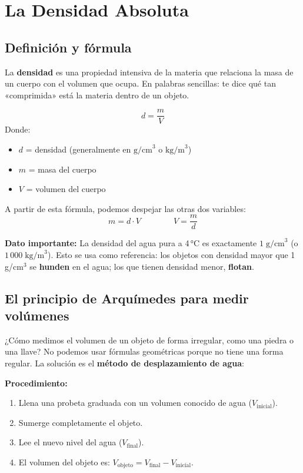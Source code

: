 \documentclass[12pt, a4paper]{article}
\begin{document}
\newpage

\section{La Densidad Absoluta}

\subsection{Definición y fórmula}

La \textbf{densidad} es una propiedad intensiva de la materia que relaciona la masa de un cuerpo con el volumen que ocupa. En palabras sencillas: te dice qué tan «comprimida» está la materia dentro de un objeto.

\begin{cuadroteoria}
$$d = \frac{m}{V}$$
Donde:
\begin{itemize}[leftmargin=*]
  \item $d$ = densidad (generalmente en $\text{g/cm}^3$ o $\text{kg/m}^3$)
  \item $m$ = masa del cuerpo
  \item $V$ = volumen del cuerpo
\end{itemize}
\end{cuadroteoria}

A partir de esta fórmula, podemos despejar las otras dos variables:
$$m = d \cdot V \qquad\qquad V = \frac{m}{d}$$

\begin{cuadroadvertencia}
\textbf{Dato importante:} La densidad del agua pura a 4\,°C es exactamente $1\;\text{g/cm}^3$ (o $1\,000\;\text{kg/m}^3$). Esto se usa como referencia: los objetos con densidad mayor que 1\,g/cm$^3$ se \textbf{hunden} en el agua; los que tienen densidad menor, \textbf{flotan}.
\end{cuadroadvertencia}

\subsection{El principio de Arquímedes para medir volúmenes}

¿Cómo medimos el volumen de un objeto de forma irregular, como una piedra o una llave? No podemos usar fórmulas geométricas porque no tiene una forma regular. La solución es el \textbf{método de desplazamiento de agua}:

\begin{cuadrosolucion}
\textbf{Procedimiento:}
\begin{enumerate}[leftmargin=*]
  \item Llena una probeta graduada con un volumen conocido de agua ($V_{\text{inicial}}$).
  \item Sumerge completamente el objeto.
  \item Lee el nuevo nivel del agua ($V_{\text{final}}$).
  \item El volumen del objeto es: $V_{\text{objeto}} = V_{\text{final}} - V_{\text{inicial}}$.
\end{enumerate}
\end{cuadrosolucion}
\end{document}
